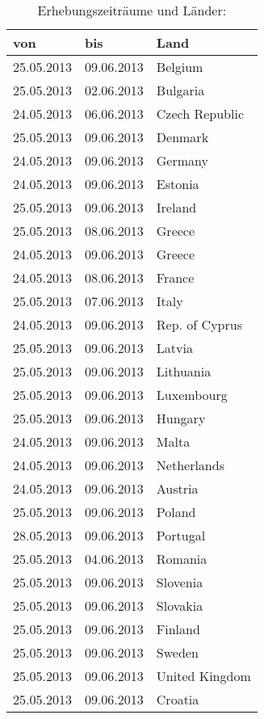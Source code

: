 \begin{table} {
		\begin{tabular}{l | l | l}
			von & bis & Land \\ \hline
			25.05.2013 & 09.06.2013 & Belgium \\
			25.05.2013 & 02.06.2013 & Bulgaria \\
			24.05.2013 & 06.06.2013 & Czech Republic \\
			25.05.2013 & 09.06.2013 & Denmark \\
			24.05.2013 & 09.06.2013 & Germany \\
			24.05.2013 & 09.06.2013 & Estonia \\
			25.05.2013 & 09.06.2013 & Ireland \\
			25.05.2013 & 08.06.2013 & Greece \\
			24.05.2013 & 09.06.2013 & Greece \\
			24.05.2013 & 08.06.2013 & France \\
			25.05.2013 & 07.06.2013 & Italy \\
			24.05.2013 & 09.06.2013 & Rep. of Cyprus \\
			25.05.2013 & 09.06.2013 & Latvia \\
			25.05.2013 & 09.06.2013 & Lithuania \\
			25.05.2013 & 09.06.2013 & Luxembourg \\
			25.05.2013 & 09.06.2013 & Hungary \\
			24.05.2013 & 09.06.2013 & Malta \\
			24.05.2013 & 09.06.2013 & Netherlands \\
			24.05.2013 & 09.06.2013 & Austria \\
			25.05.2013 & 09.06.2013 & Poland \\
			28.05.2013 & 09.06.2013 & Portugal \\
			25.05.2013 & 04.06.2013 & Romania \\
			25.05.2013 & 09.06.2013 & Slovenia \\
			25.05.2013 & 09.06.2013 & Slovakia \\
			25.05.2013 & 09.06.2013 & Finland \\
			25.05.2013 & 09.06.2013 & Sweden \\
			25.05.2013 & 09.06.2013 & United Kingdom \\
			25.05.2013 & 09.06.2013 & Croatia \\
		\end{tabular}}
	\caption{Erhebungszeiträume und Länder: \cite{eb794}}
\end{table}

